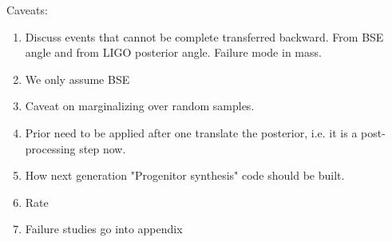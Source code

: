 \documentclass[twocolumn]{aastex631}
\begin{document}
Caveats: 
\begin{enumerate}
\item Discuss events that cannot be complete transferred backward. From BSE angle and from LIGO posterior angle. Failure mode in mass.
\item We only assume BSE
\item Caveat on marginalizing over random samples.
\item Prior need to be applied after one translate the posterior, i.e. it is a post-processing step now.
\item How next generation "Progenitor synthesis" code should be built.
\item Rate
\item Failure studies go into appendix
\end{enumerate}
\end{document}
